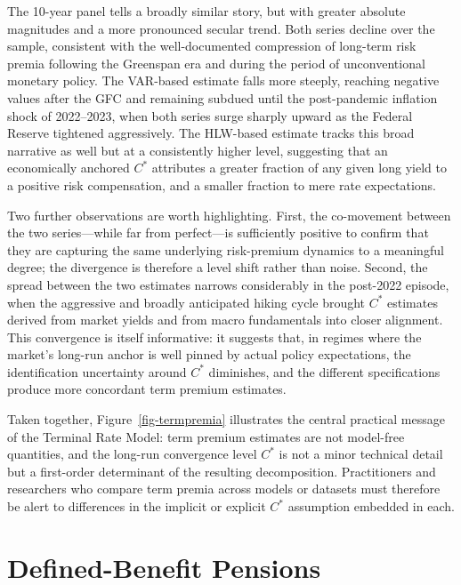 \documentclass[
  letterpaper,
  DIV=11,
  numbers=noendperiod]{scrreprt}
\begin{document}
The 10-year panel tells a broadly similar story, but with greater
absolute magnitudes and a more pronounced secular trend. Both series
decline over the sample, consistent with the well-documented compression
of long-term risk premia following the Greenspan era and during the
period of unconventional monetary policy. The VAR-based estimate falls
more steeply, reaching negative values after the GFC and remaining
subdued until the post-pandemic inflation shock of 2022--2023, when both
series surge sharply upward as the Federal Reserve tightened
aggressively. The HLW-based estimate tracks this broad narrative as well
but at a consistently higher level, suggesting that an economically
anchored \(C^{\ast}\) attributes a greater fraction of any given long
yield to a positive risk compensation, and a smaller fraction to mere
rate expectations.

Two further observations are worth highlighting. First, the co-movement
between the two series---while far from perfect---is sufficiently
positive to confirm that they are capturing the same underlying
risk-premium dynamics to a meaningful degree; the divergence is
therefore a level shift rather than noise. Second, the spread between
the two estimates narrows considerably in the post-2022 episode, when
the aggressive and broadly anticipated hiking cycle brought \(C^*\)
estimates derived from market yields and from macro fundamentals into
closer alignment. This convergence is itself informative: it suggests
that, in regimes where the market's long-run anchor is well pinned by
actual policy expectations, the identification uncertainty around
\(C^*\) diminishes, and the different specifications produce more
concordant term premium estimates.

Taken together, Figure~\ref{fig-termpremia} illustrates the central
practical message of the Terminal Rate Model: term premium estimates are
not model-free quantities, and the long-run convergence level
\(C^{\ast}\) is not a minor technical detail but a first-order
determinant of the resulting decomposition. Practitioners and
researchers who compare term premia across models or datasets must
therefore be alert to differences in the implicit or explicit
\(C^{\ast}\) assumption embedded in each.


\chapter{Defined-Benefit Pensions}\label{sec:IntroPensions}
\end{document}
